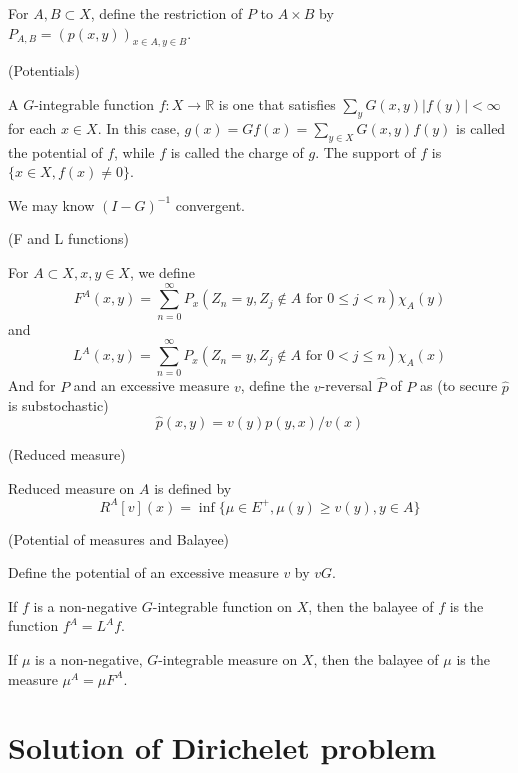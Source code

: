 \documentclass[lang=en,11pt,a4paper,citestyle =authoryear]{elegantpaper}
\newcommand{\R}{\mathbb{R}}
\begin{document}
\begin{definition}
    For $A,B\subset X$, define the restriction of $P$ to $A\times B$ by $P_{A,B} = (p(x,y))_{x\in A, y\in B}$.
\end{definition}

\begin{definition}
    (Potentials)\par
    A $G$-integrable function $f:X\to \R$ is one that satisfies $\sum\limits_{y} G(x,y)|f(y)| < \infty$ for each $x\in X$. In this case, $g(x) = Gf(x) = \sum\limits_{y\in X}G(x,y)f(y)$ is called the potential of $f$, while $f$ is called the charge of $g$. The support of $f$ is $\{x\in X, f(x) \neq 0\}$.\par
    We may know $(I-G)^{-1}$ convergent.
\end{definition}

\begin{definition}
    (F and L functions)\par
    For $A\subset X, x,y \in X$, we define
    \[
    F^A(x,y) = \sum\limits_{n=0}^{\infty}P_x(Z_n = y, Z_j \notin A\text{ for }0\leq j < n)\chi_A(y)
    \]
    and
    \[
    L^A(x,y) = \sum\limits_{n=0}^{\infty}P_x(Z_n = y, Z_j \notin A\text{ for }0<j\leq n)\chi_A(x)
   \]
   And for $P$ and an excessive measure $v$, define the $v$-reversal $\hat{P}$ of $P$ as (to secure $\hat{p}$ is substochastic)
   \[
   \hat{p}(x,y) = v(y)p(y,x)/v(x)
   \]
\end{definition}

\begin{definition}
    (Reduced measure)\par
    Reduced measure on $A$ is defined by
    \[R^A[v] (x) = \inf\{\mu\in E^+, \mu(y)\geq v(y), y\in A\}\]
\end{definition}

\begin{definition}
    (Potential of measures and Balayee)\par
    Define the potential of an excessive measure $v$ by $vG$.\par
    If $f$ is a non-negative $G$-integrable function on $X$, then the balayee of $f$ is the function $f^A = L^Af$.\par
    If $\mu$ is a non-negative, $G$-integrable measure on $X$, then the balayee of $\mu$ is the measure $\mu^A = \mu F^A$.
\end{definition}

\section{Solution of Dirichelet problem}
\end{document}

